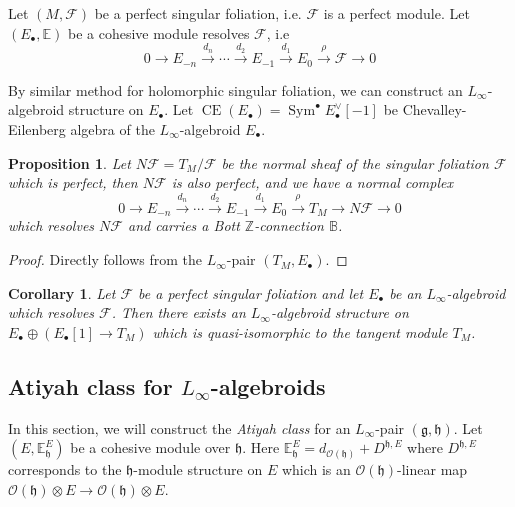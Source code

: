 \documentclass[12pt]{amsart}
\newtheorem{cor}[thm]{Corollary}
\newtheorem{prop}[thm]{Proposition}
\theoremstyle{definition}
\theoremstyle{remark}
\numberwithin{equation}{section}
\newcommand{\CF}{{\mathcal F}}
\newcommand{\CO}{{\mathcal O}}
\newcommand{\Z}{{\mathbb{Z}}}
\newcommand{\1}{{\mathbb{1}}}
\newcommand{\g}{\mathfrak{g}}
\newcommand{\h}{\mathfrak{h}}
\newcommand{\CE}{\operatorname{CE}}
\newcommand{\sym}{\operatorname{Sym}}
\begin{document}
Let $(M, \CF)$ be a perfect singular foliation, i.e. $\CF$ is a perfect module. Let $(E_{\bullet}, \mathbb{E})$ be a cohesive module resolves $\CF$, i.e \begin{equation*}
0\to  E_{-n} \stackrel{d_n}{\longrightarrow}  \cdots \stackrel{d_2}{\longrightarrow} E_{-1} \stackrel{d_1}{\longrightarrow} E_{0} \stackrel{\rho}{\longrightarrow} \CF \longrightarrow 0
\end{equation*}

By similar method for holomorphic singular foliation, we can construct an $L_{\infty}$-algebroid structure on $E_{\bullet}$. Let $\CE(E_{\bullet}) = \sym^{\bullet} E^{\vee}_{\bullet}[-1]$ be Chevalley-Eilenberg algebra of the $L_{\infty}$-algebroid $E_{\bullet}$. 
\begin{prop}
Let $N\CF = T_M/\CF$ be the normal sheaf of the singular foliation $\CF$ which is perfect, then $N\CF$ is also perfect, and we have a normal complex
\begin{equation*}
0\to  E_{-n} \stackrel{d_n}{\longrightarrow}  \cdots \stackrel{d_2}{\longrightarrow} E_{-1} \stackrel{d_1}{\longrightarrow} E_{0} \stackrel{\rho^{}}{\longrightarrow} T_M \longrightarrow N\CF \longrightarrow 0
\end{equation*}
which resolves $N\CF$ and carries a Bott $\Z$-connection $\mathbb{B}$.
\end{prop}
\begin{proof}
     Directly follows from the $L_{\infty}$-pair $(T_M, E_{\bullet})$.
\end{proof}




\begin{cor}
Let $\CF$ be a perfect singular foliation and let $E_{\bullet}$ be an $L_{\infty}$-algebroid which resolves $\CF$. Then there exists an $L_{\infty}$-algebroid structure on $E_{\bullet}\oplus(E_{\bullet}[1]\to T_M)$ which is quasi-isomorphic to the tangent module $T_M$.
\end{cor}

\subsection{Atiyah class for $L_{\infty}$-algebroids}

In this section, we will construct the {\it Atiyah class} for an $L_{\infty}$-pair $(\g, \h)$. Let $(E, \mathbb{E}_{\h}^E)$ be a cohesive module over $\h$. Here $\mathbb{E}_{\h}^E = d_{\CO(\h)} + D^{\h, E}$ where $D^{\h, E}$ corresponds to the $\h$-module structure on $E$ which is an $\CO(\h)$-linear map $\CO(\h) \otimes E\to \CO(\h) \otimes E$.
\end{document}

